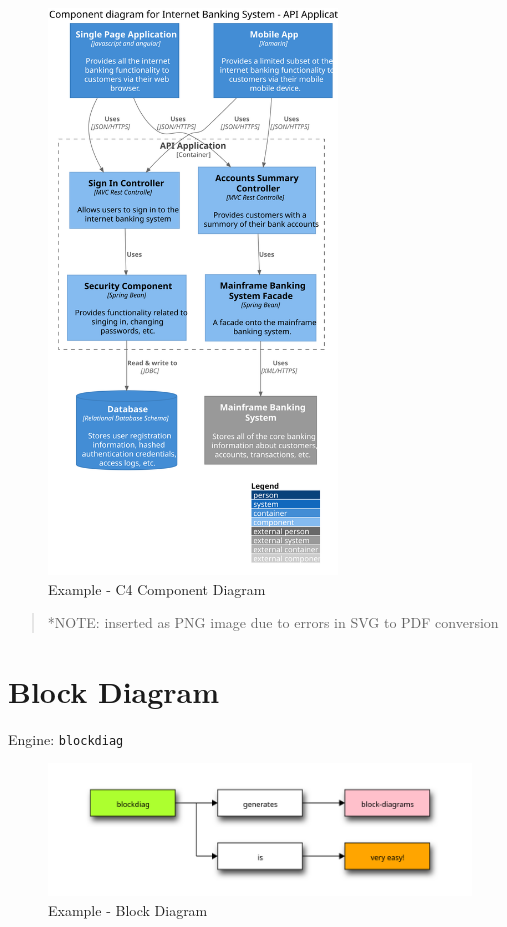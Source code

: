 \documentclass[
  12pt,
  a4paper,
  12pt,
  oneside,
  openany]{book}
\begin{document}
\begin{figure}

{\centering \includegraphics[height=15cm]{generated/diagrams-examples-c4plantuml-component-Rmd} 

}

\caption{Example - C4 Component Diagram}\label{fig:examples-c4component}
\end{figure}

\begin{quote}
*NOTE: inserted as PNG image due to errors in SVG to PDF conversion
\end{quote}

\newpage

\hypertarget{kroki-blockdiag}{%
\section{Block Diagram}\label{kroki-blockdiag}}

Engine: \texttt{blockdiag}

\begin{figure}

{\centering \includegraphics{generated/diagrams-examples-blockdiag-Rmd} 

}

\caption{Example - Block Diagram}\label{fig:examples-blockdiag}
\end{figure}
\end{document}
